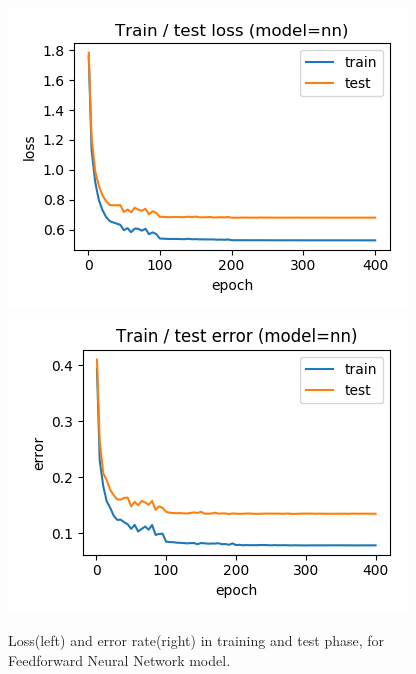 \documentclass[journal]{IEEEtran}
\begin{document}
\begin{figure}[htb]
  \includegraphics[width=\linewidth]{images/nn-loss.png}
\endminipage\hfill
{}
  \includegraphics[width=\linewidth]{images/nn-error.png}
\endminipage
\caption{Loss(left) and error rate(right) in training and test phase, for Feedforward Neural Network model.}\label{fig:nn_loss}
\end{figure}
\end{document}
